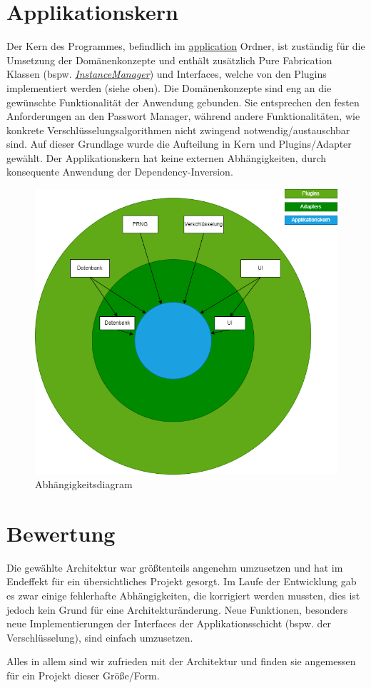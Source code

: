 \section{Applikationskern}

Der Kern des Programmes, befindlich im \href{https://github.com/moorts/Morik/tree/main/src/application}{application} Ordner, ist zuständig für die Umsetzung der Domänenkonzepte und enthält zusätzlich Pure Fabrication Klassen (bspw. \href{https://github.com/moorts/Morik/blob/main/src/application/InstanceManager.h}{\textit{InstanceManager}}) und Interfaces, welche von den Plugins implementiert werden (siehe oben). Die Domänenkonzepte sind eng an die gewünschte Funktionalität der Anwendung gebunden. Sie entsprechen den festen Anforderungen an den Passwort Manager, während andere Funktionalitäten, wie konkrete Verschlüsselungsalgorithmen nicht zwingend notwendig/austauschbar sind. Auf dieser Grundlage wurde die Aufteilung in Kern und Plugins/Adapter gewählt. Der Applikationskern hat keine externen Abhängigkeiten, durch konsequente Anwendung der Dependency-Inversion. 

\begin{figure}[ht]
	\centering
	\includegraphics[width=1.0\textwidth]{Bilder/architecture_diagram.png}
	\caption{Abhängigkeitsdiagram}
	\label{fig:CADiag}
\end{figure}

\section{Bewertung}

Die gewählte Architektur war größtenteils angenehm umzusetzen und hat im Endeffekt für ein übersichtliches Projekt gesorgt. Im Laufe der Entwicklung gab es zwar einige fehlerhafte Abhängigkeiten, die korrigiert werden mussten, dies ist jedoch kein Grund für eine Architekturänderung. Neue Funktionen, besonders neue Implementierungen der Interfaces der Applikationsschicht (bspw. der Verschlüsselung), sind einfach umzusetzen.

Alles in allem sind wir zufrieden mit der Architektur und finden sie angemessen für ein Projekt dieser Größe/Form.
